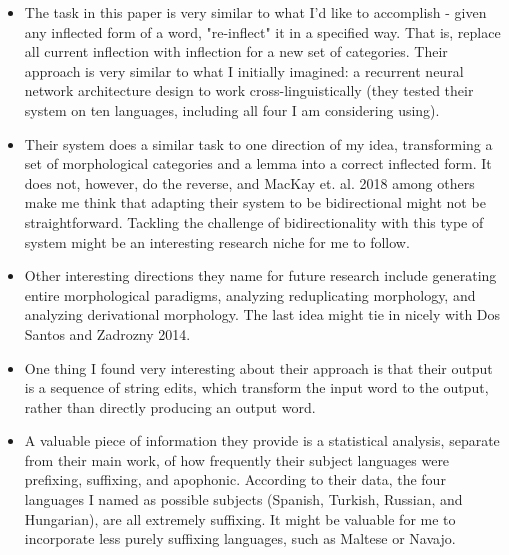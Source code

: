 \documentclass[12pt]{report}
\begin{document}
\begin{itemize}

	\item The task in this paper is very similar to what I'd like to accomplish - given any inflected form of a word, "re-inflect" it in a specified way. That is, replace all current inflection with inflection for a new set of categories. Their approach is very similar to what I initially imagined: a recurrent neural network architecture design to work cross-linguistically (they tested their system on ten languages, including all four I am considering using). 
	
	\item Their system does a similar task to one direction of my idea, transforming a set of morphological categories and a lemma into a correct inflected form. It does not, however, do the reverse, and MacKay et. al. 2018 among others make me think that adapting their system to be bidirectional might not be straightforward. Tackling the challenge of bidirectionality with this type of system might be an interesting research niche for me to follow. 
	
	\item Other interesting directions they name for future research include generating entire morphological paradigms, analyzing reduplicating morphology, and analyzing derivational morphology. The last idea might tie in nicely with Dos Santos and Zadrozny 2014.
	
	\item One thing I found very interesting about their approach is that their output is a sequence of string edits, which transform the input word to the output, rather than directly producing an output word. 
	
	\item A valuable piece of information they provide is a statistical analysis, separate from their main work, of how frequently their subject languages were prefixing, suffixing, and apophonic. According to their data, the four languages I named as possible subjects (Spanish, Turkish, Russian, and Hungarian), are all extremely suffixing. It might be valuable for me to incorporate less purely suffixing languages, such as Maltese or Navajo.

\end{itemize}



\end{document}
